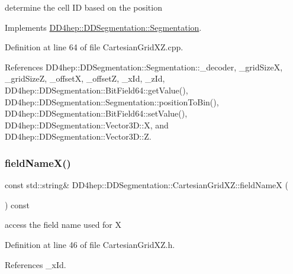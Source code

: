 determine the cell ID based on the position 



Implements \hyperlink{class_d_d4hep_1_1_d_d_segmentation_1_1_segmentation_ad5a60953d96d409850d8192f64f8ce3c}{D\+D4hep\+::\+D\+D\+Segmentation\+::\+Segmentation}.



Definition at line 64 of file Cartesian\+Grid\+X\+Z.\+cpp.



References D\+D4hep\+::\+D\+D\+Segmentation\+::\+Segmentation\+::\+\_\+decoder, \+\_\+grid\+SizeX, \+\_\+grid\+SizeZ, \+\_\+offsetX, \+\_\+offsetZ, \+\_\+x\+Id, \+\_\+z\+Id, D\+D4hep\+::\+D\+D\+Segmentation\+::\+Bit\+Field64\+::get\+Value(), D\+D4hep\+::\+D\+D\+Segmentation\+::\+Segmentation\+::position\+To\+Bin(), D\+D4hep\+::\+D\+D\+Segmentation\+::\+Bit\+Field64\+::set\+Value(), D\+D4hep\+::\+D\+D\+Segmentation\+::\+Vector3\+D\+::X, and D\+D4hep\+::\+D\+D\+Segmentation\+::\+Vector3\+D\+::Z.

\hypertarget{class_d_d4hep_1_1_d_d_segmentation_1_1_cartesian_grid_x_z_abf89a7141c0409f067134166252c92b8}{}\label{class_d_d4hep_1_1_d_d_segmentation_1_1_cartesian_grid_x_z_abf89a7141c0409f067134166252c92b8} 
\subsubsection{\texorpdfstring{field\+Name\+X()}{fieldNameX()}}
{\footnotesize\ttfamily const std\+::string\& D\+D4hep\+::\+D\+D\+Segmentation\+::\+Cartesian\+Grid\+X\+Z\+::field\+NameX (\begin{DoxyParamCaption}{ }\end{DoxyParamCaption}) const\hspace{0.3cm}{\ttfamily [inline]}}



access the field name used for X 



Definition at line 46 of file Cartesian\+Grid\+X\+Z.\+h.



References \+\_\+x\+Id.

\hypertarget{class_d_d4hep_1_1_d_d_segmentation_1_1_cartesian_grid_x_z_ac70bdf9b6eb9d473d3037bac9bf5711c}{}\label{class_d_d4hep_1_1_d_d_segmentation_1_1_cartesian_grid_x_z_ac70bdf9b6eb9d473d3037bac9bf5711c} 
